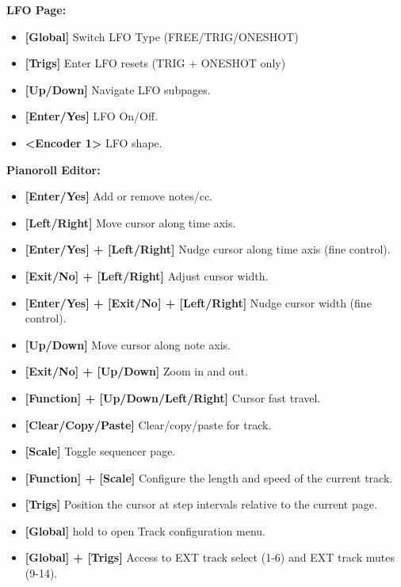 \textbf{LFO Page:} 
\begin{itemize}
     \item \textbf{[Global]} Switch LFO Type (FREE/TRIG/ONESHOT)
     \item \textbf{[Trigs] }Enter LFO resets (TRIG + ONESHOT only)
     \item \textbf{[Up/Down]} Navigate LFO subpages.
     \item \textbf{[Enter/Yes]} LFO On/Off.
     \item \textbf{<Encoder 1>} LFO shape.

     \end{itemize}
\textbf{Pianoroll Editor:}
\begin{itemize}
     \item \textbf{[Enter/Yes]} Add or remove notes/cc.
     \item \textbf{[Left/Right]} Move cursor along time axis.
     \item \textbf{[Enter/Yes] + [Left/Right]} Nudge cursor along time axis (fine control).
     \item \textbf{[Exit/No] + [Left/Right]} Adjust cursor width.
     \item \textbf{[Enter/Yes] + [Exit/No] + [Left/Right]} Nudge cursor width (fine control).
     \item \textbf{[Up/Down]} Move cursor along note axis.
     \item \textbf{[Exit/No] + [Up/Down]} Zoom in and out.
     \item \textbf{[Function] + [Up/Down/Left/Right]} Cursor fast travel.
     \item \textbf{[Clear/Copy/Paste]} Clear/copy/paste for track.
     \item \textbf{[Scale]} Toggle sequencer page.
     \item \textbf{[Function] + [Scale]} Configure the length and speed of the current track.
     \item \textbf{[Trigs]} Position the cursor at step intervals relative to the current page.
\item \textbf{[Global]} hold to open Track configuration menu.
\item \textbf{[Global] + [Trigs]} Access to EXT track select (1-6) and EXT track mutes (9-14).
\end{itemize}

